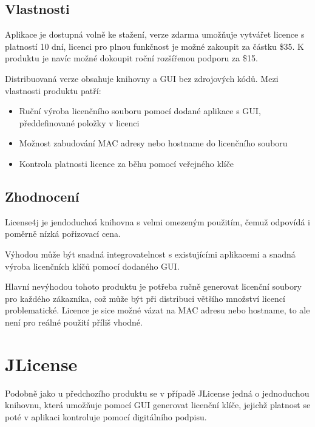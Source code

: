\subsection*{Vlastnosti}
Aplikace je dostupná volně ke stažení, verze zdarma umožňuje vytvářet licence s
platností 10 dní, licenci pro plnou funkčnost je možné zakoupit za částku \$35.
K produktu je navíc možné dokoupit roční rozšířenou podporu za \$15.

Distribuovaná verze obsahuje knihovny a GUI bez zdrojových kódů. Mezi vlastnosti
produktu patří:

\begin{itemize}
  \item Ruční výroba licenčního souboru pomocí dodané aplikace s GUI,
  předdefinované položky v licenci
  \item Možnost zabudování MAC adresy nebo hostname do licenčního souboru
  \item Kontrola platnosti licence za běhu pomocí veřejného klíče 
\end{itemize}

\subsection*{Zhodnocení}
License4j je jendoduchoá knihovna s velmi omezeným použitím, čemuž odpovídá i
poměrně nízká pořizovací cena. 

Výhodou může být snadná integrovatelnost s existujícími aplikacemi a snadná
výroba licenčních klíčů pomocí dodaného GUI.

Hlavní nevýhodou tohoto produktu je potřeba ručně generovat licenční soubory
pro každého zákazníka, což může být při distribuci většího množství licencí
problematické. Licence je sice možné vázat na MAC adresu nebo hostname, to ale
není pro reálné použití příliš vhodné.


\section{JLicense}
Podobně jako u předchozího produktu se v případě JLicense\cite{jlicense} jedná o
jednoduchou knihovnu, která umožňuje pomocí GUI generovat licenční klíče,
jejichž platnost se poté v aplikaci kontroluje pomocí digitálního podpisu.

